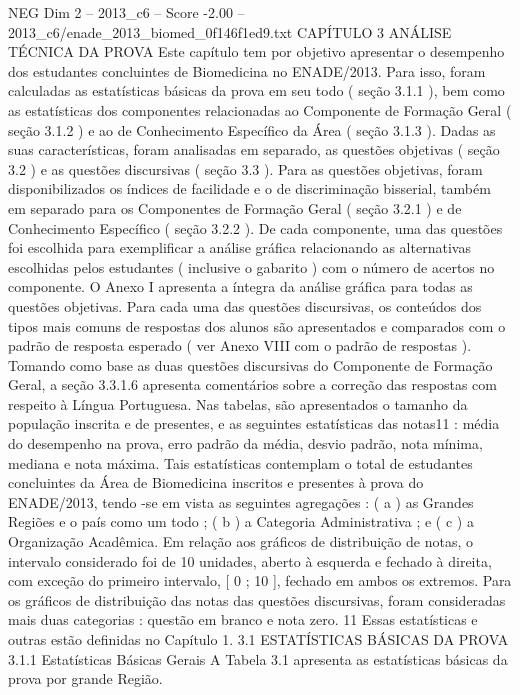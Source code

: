 \begin{textsample}{NEG Dim 2 – 2013\_c6 – Score -2.00 – 2013\_c6/enade\_2013\_biomed\_0f146f1ed9.txt}  \label{ex:f2_neg_060}
CAPÍTULO 3 ANÁLISE TÉCNICA DA PROVA Este capítulo tem por objetivo apresentar o desempenho dos estudantes concluintes de Biomedicina no ENADE/2013.
Para isso, foram calculadas as estatísticas básicas da prova em seu todo ( seção 3.1.1 ), bem como as estatísticas dos componentes relacionadas ao Componente de Formação Geral ( seção 3.1.2 ) e ao de Conhecimento Específico da Área ( seção 3.1.3 ).
Dadas as suas características, foram analisadas em separado, as questões objetivas ( seção 3.2 ) e as questões discursivas ( seção 3.3 ).
Para as questões objetivas, foram disponibilizados os índices de facilidade e o de discriminação bisserial, também em separado para os Componentes de Formação Geral ( seção 3.2.1 ) e de Conhecimento Específico ( seção 3.2.2 ).
De cada componente, uma das questões foi escolhida para exemplificar a análise gráfica relacionando as alternativas escolhidas pelos estudantes ( inclusive o gabarito ) com o número de acertos no componente.
O Anexo I apresenta a íntegra da análise gráfica para todas as questões objetivas.
Para cada uma das questões discursivas, os conteúdos dos tipos mais comuns de respostas dos alunos são apresentados e comparados com o padrão de resposta esperado ( ver Anexo VIII com o padrão de respostas ).
Tomando como base as duas questões discursivas do Componente de Formação Geral, a seção 3.3.1.6 apresenta comentários sobre a correção das respostas com respeito à Língua Portuguesa.
Nas tabelas, são apresentados o tamanho da população inscrita e de presentes, e as seguintes estatísticas das notas11 : média do desempenho na prova, erro padrão da média, desvio padrão, nota mínima, mediana e nota máxima.
Tais estatísticas contemplam o total de estudantes concluintes da Área de Biomedicina inscritos e presentes à prova do ENADE/2013, tendo -se em vista as seguintes agregações : ( a ) as Grandes Regiões e o país como um todo ; ( b ) a Categoria Administrativa ; e ( c ) a Organização Acadêmica.
Em relação aos gráficos de distribuição de notas, o intervalo considerado foi de 10 unidades, aberto à esquerda e fechado à direita, com exceção do primeiro intervalo, [ 0 ; 10 ], fechado em ambos os extremos.
Para os gráficos de distribuição das notas das questões discursivas, foram consideradas mais duas categorias : questão em branco e nota zero. 11 Essas estatísticas e outras estão definidas no Capítulo 1. 3.1 ESTATÍSTICAS BÁSICAS DA PROVA 3.1.1 Estatísticas Básicas Gerais A Tabela 3.1 apresenta as estatísticas básicas da prova por grande Região.

\end{textsample}

